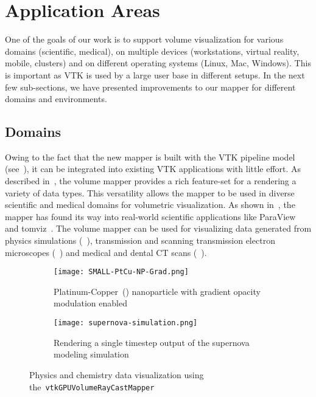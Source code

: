 \section{Application Areas}
\label{applicationareas}

One of the goals of our work is to support volume visualization for various
domains (scientific, medical), on multiple devices (workstations, virtual
reality, mobile, clusters) and on different operating systems (Linux, Mac,
Windows). This is important as VTK is used by a large user base in different
setups.  In the next few sub-sections, we have presented improvements to our
mapper for different domains and environments.

\subsection{Domains}
\label{domains}

Owing to the fact that the new mapper is built with the VTK pipeline model
(see~), it can be integrated into existing VTK
applications with little effort. As described
in~, the volume mapper provides a rich
feature-set for a rendering a variety of data types. This versatility allows the
mapper to be used in diverse scientific and medical domains for volumetric
visualization. As shown in~, the mapper has found its way into real-world scientific
applications like ParaView~\citep{ahrens_paraview:_2005, ayachit_paraview_2015,
ayachit_paraview_2015-1} and tomviz~\citep{hanwell_tomviz_2014}. The volume
mapper can be used for
visualizing data generated from physics simulations (~),
transmission and scanning transmission electron microscopes
(~) and medical and dental CT scans
(~). 

\begin{figure}[h!]
  \begin{subfigure}[t]{0.49\columnwidth}
    \texttt{[image: SMALL-PtCu-NP-Grad.png]}
    \caption{Platinum-Copper~()
      nanoparticle \protect\citep{scott_electron_2012, miao_atomic_2016} with
      gradient opacity modulation enabled}
    \label{fig:ptcu-grad}
  \end{subfigure}\hfill%
  \begin{subfigure}[t]{0.49\columnwidth}
    \texttt{[image: supernova-simulation.png]}
    \caption{Rendering a single timestep output of the supernova modeling
      simulation~\protect\citep{blondin_pulsar_2007}}
    \label{fig:supernova}
  \end{subfigure}
  \caption{Physics and chemistry data visualization using
    the~\texttt{vtkGPUVolumeRayCastMapper}}
  \label{fig:domains}
\end{figure}

